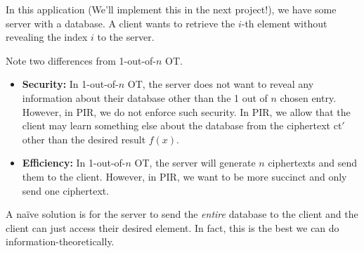 \begin{example}
    In this application (We'll implement this in the next project!), we have some server with a database. A client wants to retrieve the $i$-th element without revealing the index $i$ to the server.


    Note two differences from 1-out-of-$n$ OT.
    \begin{itemize}
        \item \textbf{Security:} In 1-out-of-$n$ OT, the server does not want to reveal any information about their database other than the 1 out of $n$ chosen entry. However, in PIR, we do not enforce such security. In PIR, we allow that the client may learn something else about the database from the ciphertext ct$'$ other than the desired result $f(x)$.
        \item \textbf{Efficiency:} In 1-out-of-$n$ OT, the server will generate $n$ ciphertexts and send them to the client. However, in PIR, we want to be more succinct and only send one ciphertext.
    \end{itemize}

    A na\"ive solution is for the server to send the \emph{entire} database to the client and the client can just access their desired element. In fact, this is the best we can do information-theoretically.

\end{example}


